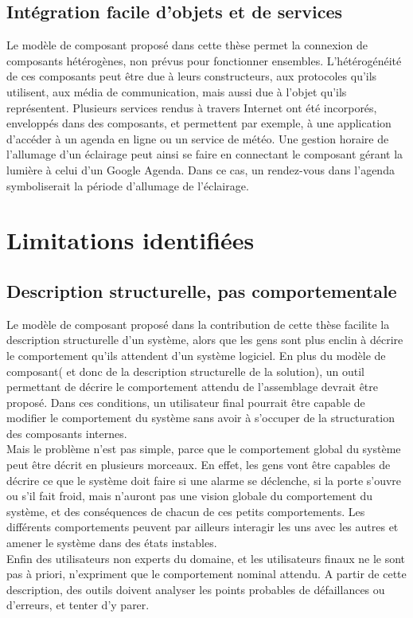 \subsection{Intégration facile d'objets et de services}
Le modèle de composant proposé dans cette thèse permet la connexion de composants hétérogènes, non prévus pour fonctionner ensembles. L'hétérogénéité de ces composants peut être due à leurs constructeurs, aux protocoles qu'ils utilisent, aux média de communication, mais aussi due à l'objet qu'ils représentent. Plusieurs services rendus à travers Internet ont été incorporés, enveloppés dans des composants, et permettent par exemple, à une application d'accéder à un agenda en ligne ou un service de météo. Une gestion horaire de l'allumage d'un éclairage peut ainsi se faire en connectant le composant gérant la lumière à celui d'un Google Agenda. Dans ce cas, un rendez-vous dans l'agenda symboliserait la période d'allumage de l'éclairage.


\section{Limitations identifiées}

\subsection{Description structurelle, pas comportementale}

Le modèle de composant proposé dans la contribution de cette thèse facilite la description structurelle d'un système, alors que les gens sont plus enclin à décrire le comportement qu'ils attendent d'un système logiciel. En plus du modèle de composant( et donc de la description structurelle de la solution), un outil permettant de décrire le comportement attendu de l'assemblage devrait être proposé. Dans ces conditions, un utilisateur final pourrait être capable de modifier le comportement du système sans avoir à s'occuper de la structuration des composants internes.\\
Mais le problème n'est pas simple, parce que le comportement global du système peut être décrit en plusieurs morceaux. En effet, les gens vont être capables de décrire ce que le système doit faire si une alarme se déclenche, si la porte s'ouvre ou s'il fait froid, mais n'auront pas une vision globale du comportement du système, et des conséquences de chacun de ces petits comportements. Les différents comportements peuvent par ailleurs interagir les uns avec les autres et amener le système dans des états instables.\\
Enfin des utilisateurs non experts du domaine, et les utilisateurs finaux ne le sont pas à priori, n'expriment que le comportement nominal attendu. A partir de cette description, des outils doivent analyser les points probables de défaillances ou d'erreurs, et tenter d'y parer.

